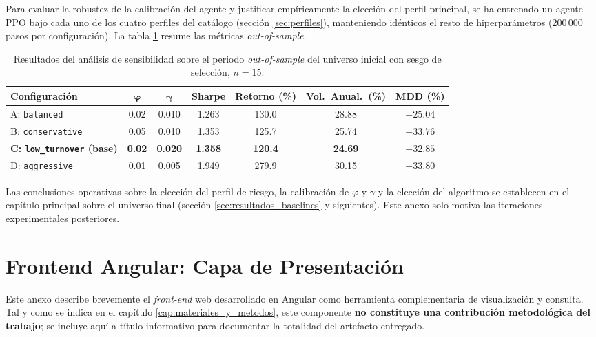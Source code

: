 \documentclass[IB,a4paper]{TFUOC}
\begin{document}
Para evaluar la robustez de la calibración del agente y justificar empíricamente la elección del perfil principal, se ha entrenado un agente PPO bajo cada uno de los cuatro perfiles del catálogo (sección \ref{sec:perfiles}), manteniendo idénticos el resto de hiperparámetros (200\,000 pasos por configuración). La tabla \ref{tab:resultados_sensitivity} resume las métricas \textit{out-of-sample}.

\begin{table}[h]
\centering
\small
\setlength{\tabcolsep}{4pt}
\renewcommand{\arraystretch}{1.25}
\begin{tabular}{|l|c|c|c|c|c|c|}
\hline
\textbf{Configuración} & $\boldsymbol{\varphi}$ & $\boldsymbol{\gamma}$ & \textbf{Sharpe} & \textbf{Retorno (\%)} & \textbf{Vol.~Anual.~(\%)} & \textbf{MDD (\%)} \\ \hline
A: \texttt{balanced} & 0.02 & 0.010 & 1.263 & 130.0 & 28.88 & $-25.04$ \\ \hline
B: \texttt{conservative} & 0.05 & 0.010 & 1.353 & 125.7 & 25.74 & $-33.76$ \\ \hline
\textbf{C: \texttt{low\_turnover} (base)} & \textbf{0.02} & \textbf{0.020} & \textbf{1.358} & \textbf{120.4} & \textbf{24.69} & $-32.85$ \\ \hline
D: \texttt{aggressive} & 0.01 & 0.005 & 1.949 & 279.9 & 30.15 & $-33.80$ \\ \hline
\end{tabular}
\caption[Análisis de sensibilidad por perfil de riesgo (universo inicial con sesgo de selección, $n=15$).]{Resultados del análisis de sensibilidad sobre el periodo \textit{out-of-sample} del universo inicial con sesgo de selección, $n=15$.}
\label{tab:resultados_sensitivity}
\end{table}

\noindent Las conclusiones operativas sobre la elección del perfil de riesgo, la calibración de $\varphi$ y $\gamma$ y la elección del algoritmo se establecen en el capítulo principal sobre el universo final (sección \ref{sec:resultados_baselines} y siguientes). Este anexo solo motiva las iteraciones experimentales posteriores.

\chapter{Frontend Angular: Capa de Presentación}
\label{anx:angular}

Este anexo describe brevemente el \textit{front-end} web desarrollado en Angular como herramienta complementaria de visualización y consulta. Tal y como se indica en el capítulo \ref{cap:materiales_y_metodos}, este componente \textbf{no constituye una contribución metodológica del trabajo}; se incluye aquí a título informativo para documentar la totalidad del artefacto entregado.
\end{document}

